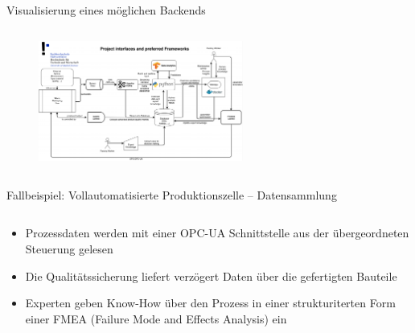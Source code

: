 \documentclass[aspectratio=1610, xcolor=dvipsnames, 9pt]{beamer}
\begin{document}
                    \begin{frame}{Visualisierung eines möglichen Backends}
                      \begin{columns}
                        \begin{column}{1\textwidth}
                           \begin{figure}
                             \centering
                              \includegraphics[width=0.6\textwidth]{images/process_v1_new.pdf}
                           \end{figure}
                         \end{column}
                      \end{columns}
                        \end{frame}

            \begin{frame}{Fallbeispiel: Vollautomatisierte Produktionszelle -- Datensammlung}
                          \begin{columns}
                            \begin{column}{1\textwidth}
                              \begin{itemize}
                                \item Prozessdaten werden mit einer OPC-UA Schnittstelle aus der übergeordneten Steuerung gelesen  \newline
                                \item Die Qualitätssicherung liefert verzögert Daten über die gefertigten Bauteile  \newline
                                \item Experten geben Know-How über den Prozess in einer strukturiterten Form einer FMEA (Failure Mode and Effects Analysis) ein \newline
                              \end{itemize}
                            \end{column}
                          \end{columns}
               \end{frame}   
          
\end{document}
